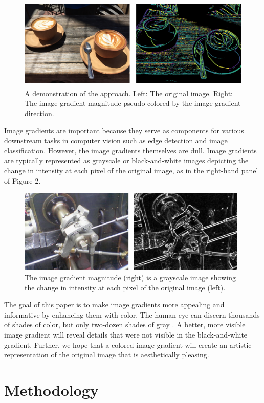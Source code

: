 \documentclass[runningheads]{llncs}
\begin{document}
\begin{figure}
\centering
\includegraphics[height=4.4cm]{images/intro.png}
\caption{A demonstration of the approach. Left: The original image. Right: The image gradient magnitude pseudo-colored by the image gradient direction.}
\label{fig:example}
\end{figure}

Image gradients are important because they serve as components for various downstream tasks in computer vision such as edge detection and image classification. However, the image gradients themselves are dull. Image gradients are typically represented as grayscale or black-and-white images depicting the change in intensity at each pixel of the original image, as in the right-hand panel of Figure 2.

\begin{figure}
\centering
\includegraphics[height=4cm]{images/image_gradient.png}
\caption{The image gradient magnitude (right) is a grayscale image showing the change in intensity at each pixel of the original image (left).}
\label{fig:example}
\end{figure}

The goal of this paper is to make image gradients more appealing and informative by enhancing them with color. The human eye can discern thousands of shades of color, but only two-dozen shades of gray \cite{human_machine}. A better, more visible image gradient will reveal details that were not visible in the black-and-white gradient. Further, we hope that a colored image gradient will create an artistic representation of the original image that is aesthetically pleasing.

\section{Methodology}
\end{document}
